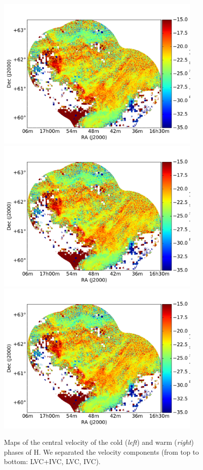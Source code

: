 \documentclass[traditabstract]{aa}
\begin{document}
\begin{figure}[h]
  \hspace{5mm}
  \includegraphics[page=5,height=7.5cm,trim=110 35 105 75,clip=true]{Figures/DHIGLS_velo.pdf} \\
  \vspace{5mm}
  \includegraphics[page=3,height=7.5cm,trim=110 35 105 75,clip=true]{Figures/DHIGLS_velo.pdf}
  \hspace{5mm}
  \includegraphics[page=6,height=7.5cm,trim=110 35 105 75,clip=true]{Figures/DHIGLS_velo.pdf}
  \caption{Maps of the central velocity of the cold (\emph{left}) and warm (\emph{right}) phases of H. We separated the velocity components (from top to bottom: LVC+IVC, LVC, IVC).}
\end{figure}
\end{document}
